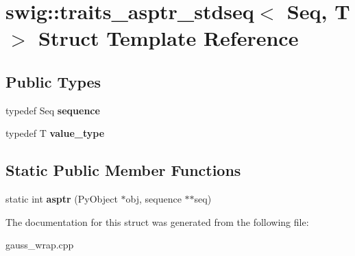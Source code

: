 \hypertarget{structswig_1_1traits__asptr__stdseq}{\section{swig\-:\-:traits\-\_\-asptr\-\_\-stdseq$<$ Seq, T $>$ Struct Template Reference}
\label{structswig_1_1traits__asptr__stdseq}
}
\subsection*{Public Types}
\begin{DoxyCompactItemize}
\item 
\hypertarget{structswig_1_1traits__asptr__stdseq_acc3237a1f41e649f169c938930068a35}{typedef Seq {\bfseries sequence}}\label{structswig_1_1traits__asptr__stdseq_acc3237a1f41e649f169c938930068a35}

\item 
\hypertarget{structswig_1_1traits__asptr__stdseq_a18bb424b58bc29aa995ff6d246499ee5}{typedef T {\bfseries value\-\_\-type}}\label{structswig_1_1traits__asptr__stdseq_a18bb424b58bc29aa995ff6d246499ee5}

\end{DoxyCompactItemize}
\subsection*{Static Public Member Functions}
\begin{DoxyCompactItemize}
\item 
\hypertarget{structswig_1_1traits__asptr__stdseq_a20c63611de0e0b36a51bf9b1ff41af48}{static int {\bfseries asptr} (Py\-Object $\ast$obj, sequence $\ast$$\ast$seq)}\label{structswig_1_1traits__asptr__stdseq_a20c63611de0e0b36a51bf9b1ff41af48}

\end{DoxyCompactItemize}


The documentation for this struct was generated from the following file\-:\begin{DoxyCompactItemize}
\item 
gauss\-\_\-wrap.\-cpp\end{DoxyCompactItemize}
